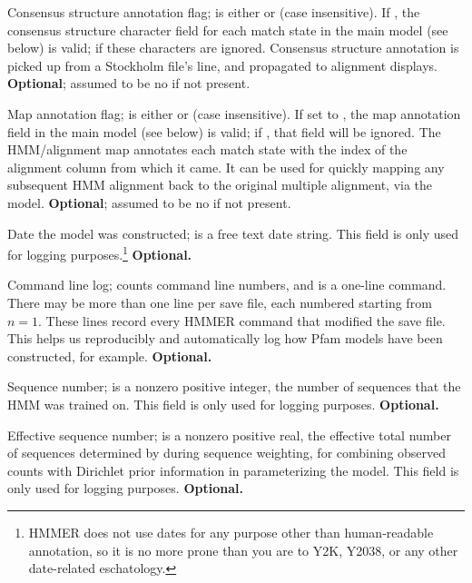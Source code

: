 \begin{sreitems}{}
\item [\monob{CS <s>}] Consensus structure annotation flag;
 is either  or  (case insensitive). If
, the consensus structure character field for each match
state in the main model (see below) is valid; if  these
characters are ignored. Consensus structure annotation is picked up
from a Stockholm file's  line, and propagated to
alignment displays.  \textbf{Optional}; assumed to be no if not
present.

\item [\monob{MAP <s>}] Map annotation flag;  is either
 or  (case insensitive).  If set to , the
map annotation field in the main model (see below) is valid; if
, that field will be ignored.  The HMM/alignment map
annotates each match state with the index of the alignment column from
which it came. It can be used for quickly mapping any subsequent
HMM alignment back to the original multiple alignment, via the model.
\textbf{Optional}; assumed to be no if not present.

\item [\monob{DATE <s>}] Date the model was constructed; 
is a free text date string.  This field is only used for logging
purposes.\footnote{HMMER does not use dates for any purpose other than
human-readable annotation, so it is no more prone than you are to Y2K,
Y2038, or any other date-related eschatology.} \textbf{Optional.}

\item [\monob{COM [<n>] <s>}] Command line log;  counts
command line numbers, and  is a one-line command. There may
be more than one  line per save file, each numbered starting
from $n=1$. These lines record every HMMER command that modified the
save file. This helps us reproducibly and automatically log how Pfam
models have been constructed, for example. \textbf{Optional.}

\item [\monob{NSEQ  <d>}] Sequence number;  is a nonzero
positive integer, the number of sequences that the HMM was trained on.
This field is only used for logging purposes.
\textbf{Optional.}

\item [\monob{EFFN <f>}] Effective sequence number;  is a
nonzero positive real, the effective total number of sequences
determined by  during sequence weighting, for combining
observed counts with Dirichlet prior information in parameterizing the
model. This field is only used for logging purposes.
\textbf{Optional.}


\end{sreitems}
